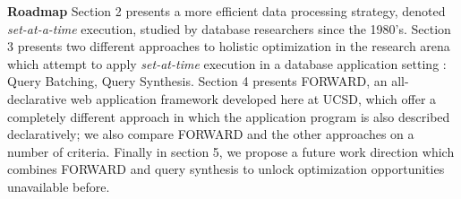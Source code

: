 \textbf{Roadmap} Section 2 presents a more efficient data processing strategy, denoted \emph{set-at-a-time} execution, studied by database researchers since the 1980's. Section 3 presents two different approaches to holistic optimization in the research arena which attempt to apply \emph{set-at-time} execution in a database application setting : Query Batching, Query Synthesis. Section 4 presents FORWARD, an all-declarative web application framework developed here at UCSD, which offer a completely different approach in which the application program is also described declaratively; we also compare FORWARD and the other approaches on a number of criteria. Finally in section 5, we propose a future work direction which combines FORWARD and query synthesis to unlock optimization opportunities unavailable before.